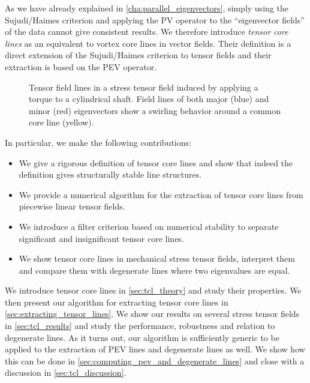 %
As we have already explained in \cref{cha:parallel_eigenvectors}, simply using
the Sujudi/Haimes criterion and applying the \ac{PV} operator to the
``eigenvector fields'' of the data cannot give consistent results.
%
We therefore introduce \emph{tensor core lines} as an equivalent to vortex
core lines in vector fields.
%
Their definition is a direct extension of the Sujudi/Haimes criterion to tensor
fields and their extraction is based on the \ac{PEV} operator.
%
\begin{figure}[t]
    \centering
    \setlength\figurewidth\textwidth
    
    \caption{Tensor field lines in a stress tensor field induced by
             applying a torque to a cylindrical shaft. Field lines of both major
             (blue) and minor (red) eigenvectors show a swirling behavior around
             a common core line (yellow).}
    \label{fig:tube_lines}
\end{figure}
%
In particular, we make the following contributions:
%
\begin{itemize}
    \item  We give a rigorous definition of tensor core lines and show that
    indeed the definition gives structurally stable line structures.
    \item We provide a numerical algorithm for the extraction of tensor core
    lines from piecewise linear tensor fields.
    \item We introduce a filter criterion based on numerical stability to
    separate significant and insignificant tensor core lines.
    \item We show tensor core lines in mechanical stress tensor fields,
    interpret them and compare them with degenerate lines where two eigenvalues
    are equal.
\end{itemize}
%
We introduce tensor core lines in \cref{sec:tcl_theory} and study their
properties.
%
We then present our algorithm for extracting tensor core lines in
\cref{sec:extracting_tensor_lines}.
%
We show our results on several stress tensor fields in \cref{sec:tcl_results}
and study the performance, robustness and relation to degenerate lines.
%
As it turns out, our algorithm is sufficiently generic to be applied to the
extraction of \ac{PEV} lines and degenerate lines as well.
%
We show how this can be done in \cref{sec:computing_pev_and_degenerate_lines}
and close with a discussion in \cref{sec:tcl_discussion}.
%
